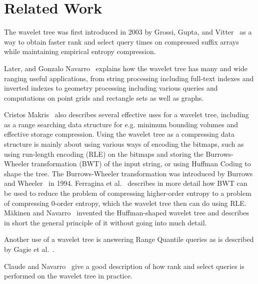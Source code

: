 \section{Related Work}
The wavelet tree was first introduced in 2003 by Grossi, Gupta, and Vitter~\citep[Section 4.2]{Grossi:2003:HET:644108.644250} as a way to obtain faster rank and select query times on compressed suffix arrays while maintaining empirical entropy compression.

Later, and Gonzalo Navarro~\citep{Navjda13} explains how the wavelet tree has many and wide ranging useful applications, from string processing including full-text indexes and inverted indexes to geometry processing including various queries and computations on point grids and rectangle sets as well as graphs.

Cristos Makris~\citep{WTSurvey} also describes several effective uses for a wavelet tree, including as a range searching data structure for e.g. minimum bounding volumes and effective storage compression.
Using the wavelet tree as a compressing data structure is mainly about using various ways of encoding the bitmaps, such as using run-length encoding (RLE) on the bitmaps and storing the Burrows-Wheeler transformation (BWT) of the input string, or using Huffman Coding to shape the tree.
The Burrows-Wheeler transformation was introduced by Burrows and Wheeler~\citep{BWToriginalArticle} in 1994.
Ferragina et al.~\citep{waveletTreeEntropy} describes in more detail how BWT can be used to reduce the problem of compressing higher-order entropy to a problem of compressing 0-order entropy, which the wavelet tree then can do using RLE.
Mäkinen and Navarro~\citep[Section~4]{FMcountOnBWT} invented the Huffman-shaped wavelet tree and describes in short the general principle of it without going into much detail.

Another use of a wavelet tree is answering Range Quantile queries as is described by Gagie et al.~\citep[Section 3]{RangeQuantileQueries}.



Claude and Navarro~\citep[Section~2.2]{Claude08practicalrankselect} give a good description of how rank and select queries is performed on the wavelet tree in practice.